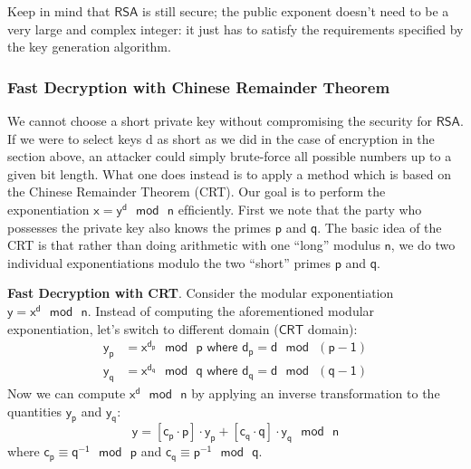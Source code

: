 \documentclass{article}
\begin{document}
\par \noindent Keep in mind that $\mathsf{RSA}$ is still secure; the public exponent doesn't need to be a very large and complex integer: it just has to satisfy the requirements specified by the key generation algorithm.

\subsubsection{Fast Decryption with Chinese Remainder Theorem}
We cannot choose a short private key without compromising the security for $\mathsf{RSA}$. If we were to select keys d as short as we did in the case of encryption in the section above, an attacker could simply brute-force all possible numbers up to a given bit length. What one does instead is to apply a method which is based on the Chinese Remainder Theorem (CRT). Our goal is to perform the exponentiation $\mathsf{x = y^{d} \text{ } mod \text{ } n}$ efﬁciently. First we note that the party who possesses the private key also knows the primes $\mathsf{p}$ and $\mathsf{q}$. The basic idea of the CRT is that rather than doing arithmetic with one “long” modulus $\mathsf{n}$, we do two individual exponentiations modulo the two “short” primes $\mathsf{p}$ and $\mathsf{q}$.

\begin{boxH}
    \textbf{Fast Decryption with CRT}. Consider the modular exponentiation $\mathsf{y = x^d \text{ } mod \text{ } n}$. Instead of computing the aforementioned modular exponentiation, let's switch to different domain ($\mathsf{CRT}$ domain):
    \begin{align*}
        \mathsf{y_p} &= \mathsf{x^{d_p} \text{ } mod \text{ } p \text{ where } d_p = d \text{ } mod \text{ } (p-1)} \\ 
        \mathsf{y_q} &= \mathsf{x^{d_q} \text{ } mod \text{ } q \text{ where } d_q = d \text{ } mod \text{ } (q-1)}
    \end{align*}
    Now we can compute $\mathsf{x^d \text{ } mod \text{ } n}$ by applying an inverse transformation to the quantities $\mathsf{y_p}$ and $\mathsf{y_q}$:
    \begin{equation*}
        \mathsf{y = [c_p \cdot p] \cdot y_p + [c_q \cdot q] \cdot y_q \text{ } mod \text{ } n}
    \end{equation*}
    where $\mathsf{c_p \equiv q^{-1} \text{ } mod \text{ } p}$ and $\mathsf{c_q \equiv p^{-1} \text{ } mod \text{ } q}$.
\end{boxH}
\end{document}
